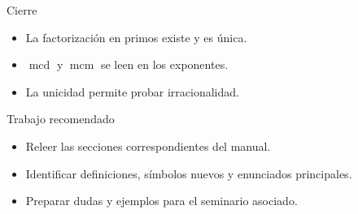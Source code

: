 \documentclass[aspectratio=169,11pt]{beamer}
\newcommand{\mcd}{\operatorname{mcd}}
\newcommand{\mcm}{\operatorname{mcm}}
\begin{document}
\begin{frame}{Cierre}
\begin{itemize}
  \item La factorización en primos existe y es única.
  \item \(\mcd\) y \(\mcm\) se leen en los exponentes.
  \item La unicidad permite probar irracionalidad.
\end{itemize}
\end{frame}

\begin{frame}{Trabajo recomendado}
\begin{itemize}
  \item Releer las secciones correspondientes del manual.
  \item Identificar definiciones, símbolos nuevos y enunciados principales.
  \item Preparar dudas y ejemplos para el seminario asociado.
\end{itemize}
\end{frame}
\end{document}
